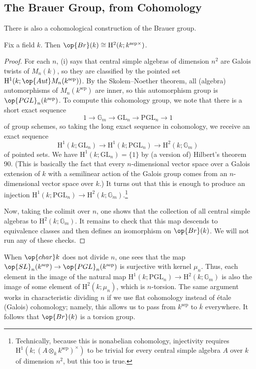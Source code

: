 \documentclass[../notes.tex]{subfiles}
\begin{document}
\subsection{The Brauer Group, from Cohomology}
There is also a cohomological construction of the Brauer group.
\begin{proposition} \label{prop:brauer-cohomology}
	Fix a field $k$. Then $\op{Br}(k)\cong\mathrm H^2(k;k^{\mathrm{sep}\times})$.
\end{proposition}
\begin{proof}
	For each $n$, (i) says that central simple algebras of dimension $n^2$ are Galois twists of $M_n(k)$, so they are classified by the pointed set $\mathrm H^1(k;\op{Aut}M_n(k^{\mathrm{sep}}))$. By the Skolem--Noether theorem, all (algebra) automorphisms of $M_n(k^{\mathrm{sep}})$ are inner, so this automorphism group is $\op{PGL}_n(k^{\mathrm{sep}})$. To compute this cohomology group, we note that there is a short exact sequence
	\[1\to\mathbb G_m\to\mathrm{GL}_n\to\mathrm{PGL}_n\to1\]
	of group schemes, so taking the long exact sequence in cohomology, we receive an exact sequence
	\[\mathrm H^1(k;\mathrm{GL}_n)\to\mathrm H^1(k;\mathrm{PGL}_n)\to\mathrm H^2(k;\mathbb G_m)\]
	of pointed sets. We have $\mathrm H^1(k;\mathrm{GL}_n)=\{1\}$ by (a version of) Hilbert's theorem 90. (This is basically the fact that every $n$-dimensional vector space over a Galois extension of $k$ with a semilinear action of the Galois group comes from an $n$-dimensional vector space over $k$.) It turns out that this is enough to produce an injection $\mathrm H^1(k;\mathrm{PGL}_n)\to\mathrm H^2(k;\mathbb G_m)$.\footnote{Technically, because this is nonabelian cohomology, injectivity requires $\mathrm H^1(k; (A\otimes_k k^{\mathrm{sep}})^\times)$ to be trivial for every central simple algebra $A$ over $k$ of dimension $n^2$, but this too is true.}

	Now, taking the colimit over $n$, one shows that the collection of all central simple algebras to $\mathrm H^2(k;\mathbb G_m)$. It remains to check that this map descends to equivalence classes and then defines an isomorphism on $\op{Br}(k)$. We will not run any of these checks.
\end{proof}
\begin{remark}
	When $\op{char}k$ does not divide $n$, one sees that the map $\op{SL}_n(k^{\mathrm{sep}})\to\op{PGL}_n(k^{\mathrm{sep}})$ is surjective with kernel $\mu_n$. Thus, each element in the image of the natural map $\mathrm H^1(k;\mathrm{PGL}_n)\to\mathrm H^2(k;\mathbb G_m)$ is also the image of some element of $\mathrm H^2(k;\mu_n)$, which is $n$-torsion. The same argument works in characteristic dividing $n$ if we use flat cohomology instead of \'etale (Galois) cohomology; namely, this allows us to pass from $k^{\mathrm{sep}}$ to $\overline k$ everywhere. It follows that $\op{Br}(k)$ is a torsion group.
\end{remark}
\end{document}
